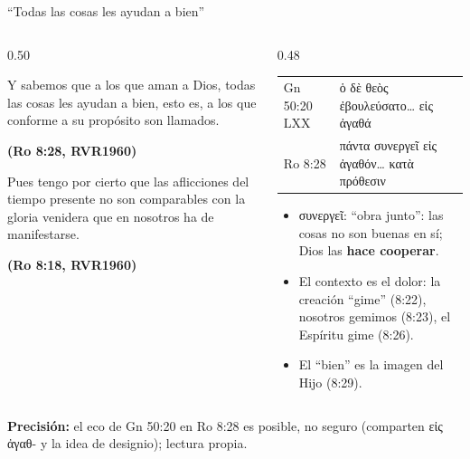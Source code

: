 \documentclass[hyperref={bookmarks=false},aspectratio=169]{beamer}
\newcommand{\grc}[1]{\foreignlanguage{ancientgreek}{#1}}
\newcommand{\fuente}[1]{\par\hfill{\upshape\bfseries\footnotesize\textcolor{azul}{#1}}}
\newcommand{\destacar}[1]{\textbf{\textcolor{azul}{#1}}}
\newcommand{\precision}[1]{{\footnotesize\color{gris}\textbf{Precisión:} #1}}
\begin{document}
\begin{frame}{``Todas las cosas les ayudan a bien''}
\begin{columns}[t,onlytextwidth]
\begin{column}{0.50\textwidth}
\begin{cita}Y sabemos que a los que aman a Dios, todas las cosas les ayudan a bien, esto es, a los que conforme a su propósito son llamados.\fuente{(Ro 8:28, RVR1960)}\end{cita}
\begin{cita}Pues tengo por cierto que las aflicciones del tiempo presente no son comparables con la gloria venidera que en nosotros ha de manifestarse.\fuente{(Ro 8:18, RVR1960)}\end{cita}
\end{column}
\begin{column}{0.48\textwidth}
\scriptsize\renewcommand{\arraystretch}{1.15}
\begin{tabular}{@{}>{\RaggedRight\arraybackslash}p{1.5cm}>{\RaggedRight\arraybackslash}p{4.1cm}@{}}
\toprule
Gn 50:20 LXX & \grc{ὁ δὲ θεὸς ἐβουλεύσατο\ldots{} εἰς ἀγαθά} \\
Ro 8:28 & \grc{πάντα συνεργεῖ εἰς ἀγαθόν\ldots{} κατὰ πρόθεσιν} \\
\bottomrule
\end{tabular}\par\smallskip
\small\begin{itemize}
\item \grc{συνεργεῖ}: ``obra junto'': las cosas no son buenas en sí; Dios las \destacar{hace cooperar}.
\item El contexto es el dolor: la creación ``gime'' (8:22), nosotros gemimos (8:23), el Espíritu gime (8:26).
\item El ``bien'' es la imagen del Hijo (8:29).
\end{itemize}
\end{column}
\end{columns}\par\smallskip
\precision{el eco de Gn 50:20 en Ro 8:28 es posible, no seguro (comparten \grc{εἰς ἀγαθ-} y la idea de designio); lectura propia.}
\end{frame}
\end{document}
